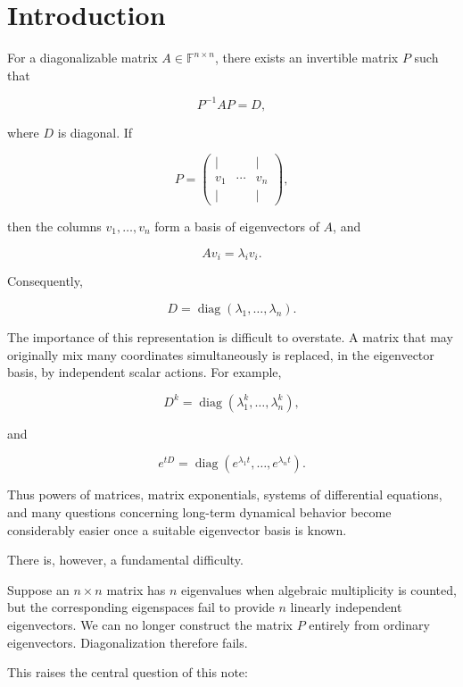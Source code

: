\documentclass[11pt]{article}
\begin{document}
\tableofcontents
\newpage

\section{Introduction}

For a diagonalizable matrix \(A\in\mathbb{F}^{n\times n}\), there exists
an invertible matrix \(P\) such that

\[
P^{-1}AP=D,
\]

where \(D\) is diagonal.  If

\[
P=
\begin{pmatrix}
\vert & & \vert\\
v_1 & \cdots & v_n\\
\vert & & \vert
\end{pmatrix},
\]

then the columns \(v_1,\ldots,v_n\) form a basis of eigenvectors of
\(A\), and

\[
Av_i=\lambda_i v_i.
\]

Consequently,

\[
D=
\operatorname{diag}
(\lambda_1,\ldots,\lambda_n).
\]

The importance of this representation is difficult to overstate.
A matrix that may originally mix many coordinates simultaneously is
replaced, in the eigenvector basis, by independent scalar actions.
For example,

\[
D^k=
\operatorname{diag}
(\lambda_1^k,\ldots,\lambda_n^k),
\]

and

\[
e^{tD}
=
\operatorname{diag}
(e^{\lambda_1t},\ldots,e^{\lambda_nt}).
\]

Thus powers of matrices, matrix exponentials, systems of differential
equations, and many questions concerning long-term dynamical behavior
become considerably easier once a suitable eigenvector basis is known.

There is, however, a fundamental difficulty.

Suppose an \(n\times n\) matrix has \(n\) eigenvalues when algebraic
multiplicity is counted, but the corresponding eigenspaces fail to
provide \(n\) linearly independent eigenvectors.  We can no longer
construct the matrix \(P\) entirely from ordinary eigenvectors.
Diagonalization therefore fails.

This raises the central question of this note:
\end{document}
